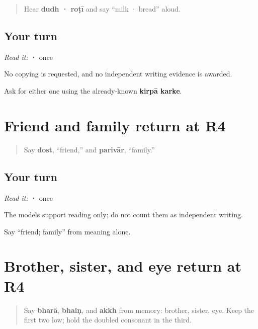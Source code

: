\label{lesson:PA-R25-milk-bread-r4}



\begin{quote}
Hear \textbf{dudh · roṭī} and say “milk · bread” aloud.
\end{quote}

\subsection*{Your turn}
\emph{Read it:} \textbf{ · } once

No copying is requested, and no independent writing evidence is awarded.

\begin{tcolorbox}[breakable,colback=teal!4,colframe=teal!35!black,title={Before you move on}]
Ask for either one using the already-known \textbf{kirpā karke}.
\end{tcolorbox}
\section[Practice]{Friend and family return at R4}

\label{lesson:PA-R25-friend-family-r4}



\begin{quote}
Say \textbf{dost}, “friend,” and \textbf{parivār}, “family.”
\end{quote}

\subsection*{Your turn}
\emph{Read it:} \textbf{ · } once

The models support reading only; do not count them as independent writing.

\begin{tcolorbox}[breakable,colback=teal!4,colframe=teal!35!black,title={Before you move on}]
Say “friend; family” from meaning alone.
\end{tcolorbox}
\section[Practice]{Brother, sister, and eye return at R4}

\label{lesson:PA-R25-kin-eye-r4}



\begin{quote}
Say \textbf{bharā}, \textbf{bhaiṇ}, and \textbf{akkh} from memory: brother, sister, eye. Keep the first two low; hold the doubled consonant in the third.
\end{quote}

